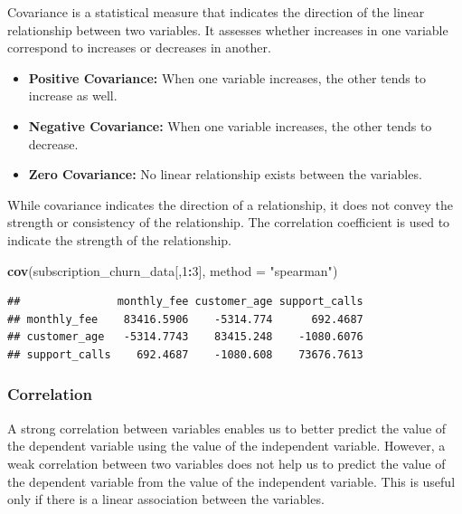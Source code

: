 \documentclass[
]{article}
\newenvironment{Shaded}{\begin{snugshade}}{\end{snugshade}}
\newcommand{\AttributeTok}[1]{\textcolor[rgb]{0.13,0.29,0.53}{#1}}
\newcommand{\DecValTok}[1]{\textcolor[rgb]{0.00,0.00,0.81}{#1}}
\newcommand{\FunctionTok}[1]{\textcolor[rgb]{0.13,0.29,0.53}{\textbf{#1}}}
\newcommand{\NormalTok}[1]{#1}
\newcommand{\SpecialCharTok}[1]{\textcolor[rgb]{0.81,0.36,0.00}{\textbf{#1}}}
\newcommand{\StringTok}[1]{\textcolor[rgb]{0.31,0.60,0.02}{#1}}
\begin{document}
Covariance is a statistical measure that indicates the direction of the
linear relationship between two variables. It assesses whether increases
in one variable correspond to increases or decreases in
another.\hspace{0pt}

\begin{itemize}
\item
  \textbf{Positive Covariance:} When one variable increases, the other
  tends to increase as well.
\item
  \textbf{Negative Covariance:} When one variable increases, the other
  tends to decrease.
\item
  \textbf{Zero Covariance:} No linear relationship exists between the
  variables.
\end{itemize}

While covariance indicates the direction of a relationship, it does not
convey the strength or consistency of the relationship. The correlation
coefficient is used to indicate the strength of the relationship.

\begin{Shaded}
\begin{Highlighting}[]
\FunctionTok{cov}\NormalTok{(subscription\_churn\_data[,}\DecValTok{1}\SpecialCharTok{:}\DecValTok{3}\NormalTok{], }\AttributeTok{method =} \StringTok{"spearman"}\NormalTok{)}
\end{Highlighting}
\end{Shaded}

\begin{verbatim}
##               monthly_fee customer_age support_calls
## monthly_fee    83416.5906    -5314.774      692.4687
## customer_age   -5314.7743    83415.248    -1080.6076
## support_calls    692.4687    -1080.608    73676.7613
\end{verbatim}

\subsubsection{Correlation}\label{correlation}

A strong correlation between variables enables us to better predict the
value of the dependent variable using the value of the independent
variable. However, a weak correlation between two variables does not
help us to predict the value of the dependent variable from the value of
the independent variable. This is useful only if there is a linear
association between the variables.
\end{document}
